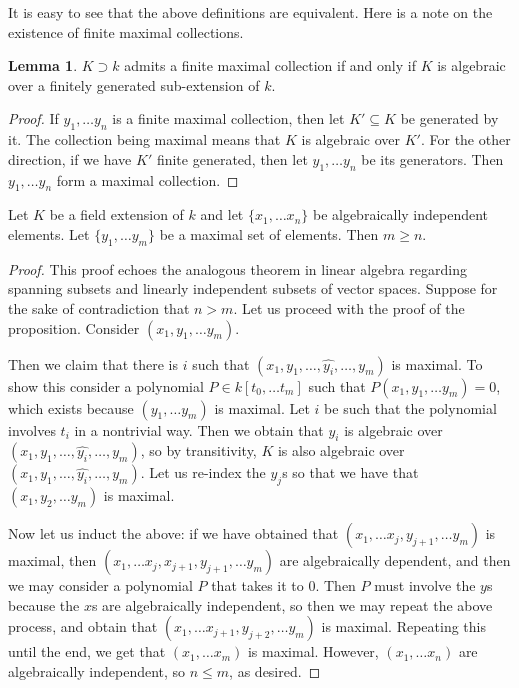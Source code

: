 \documentclass[12 pt]{article}
\theoremstyle{definition}
\newtheorem{lemma}[theorem]{Lemma}
\begin{document}
It is easy to see that the above definitions are equivalent. Here is a note on the existence of finite maximal collections.


\begin{lemma}$K\supset k$ admits a finite maximal collection if and only if $K$ is algebraic over a finitely generated sub-extension of $k$.
\end{lemma}
\begin{proof}If $y_1, \ldots y_n$ is a finite maximal collection, then let $K' \subseteq K$ be generated by it. The collection being maximal means that $K$ is algebraic over $K'$. For the other direction, if we have $K'$ finite generated, then let $y_1, \ldots y_n$ be its generators. Then $y_1, \ldots y_n$ form a maximal collection.
\end{proof}


\begin{proposition} Let $K$ be a field extension of $k$ and let $\{x_1, \ldots x_n\}$ be algebraically independent elements. Let $\{y_1, \ldots y_m\}$ be a maximal set of elements. Then $m \geq n$.
\end{proposition}
\begin{proof}


This proof echoes the analogous theorem in linear algebra regarding spanning subsets and linearly independent subsets of vector spaces. Suppose for the sake of contradiction that $n>m$. Let us proceed with the proof of the proposition. Consider $(x_1, y_1, \ldots y_m)$.

Then we claim that there is $i$ such that $(x_1, y_1, \ldots , \widehat{y_i}, \ldots, y_m)$ is maximal. To show this consider a polynomial $P \in k[t_0, \ldots t_m]$ such that $P(x_1,y_1, \ldots y_m)=0$, which exists because $(y_1, \ldots y_m)$ is maximal. Let $i$ be such that the polynomial involves $t_i$ in a nontrivial way. Then we obtain that $y_i$ is algebraic over $(x_1, y_1, \ldots , \widehat{y_i}, \ldots, y_m)$, so by transitivity, $K$ is also algebraic over $(x_1, y_1, \ldots , \widehat{y_i}, \ldots, y_m)$. Let us re-index the $y_j$s so that we have that $(x_1, y_2, \ldots y_m)$ is maximal.

Now let us induct the above: if we have obtained that $(x_1, \ldots x_j, y_{j+1}, \ldots y_m)$ is maximal, then $(x_1, \ldots x_j,x_{j+1}, y_{j+1}, \ldots y_m)$ are algebraically dependent, and then we may consider a polynomial $P$ that takes it to 0. Then $P$ must involve the $y$s because the $x$s are algebraically independent, so then we may repeat the above process, and obtain that $(x_1, \ldots x_{j+1}, y_{j+2}, \ldots y_m)$ is maximal. Repeating this until the end, we get that $(x_1, \ldots x_m)$ is maximal. However, $(x_1, \ldots x_n)$ are algebraically independent, so $n \leq m$, as desired.
\end{proof}
\end{document}
